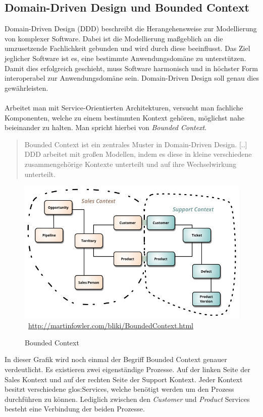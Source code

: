 \subsection{Domain-Driven Design und Bounded Context}
\label{sec:boundedContext}
Domain-Driven Design (DDD) beschreibt die Herangehensweise zur Modellierung von komplexer Software. Dabei ist die Modellierung maßgeblich an die umzusetzende Fachlichkeit gebunden und wird durch diese beeinflusst. Das Ziel jeglicher Software ist es, eine bestimmte Anwendungsdomäne zu unterstützen. Damit dies erfolgreich geschieht, muss Software harmonisch und in höchster Form interoperabel zur Anwendungsdomäne sein. Domain-Driven Design soll genau dies gewährleisten.
\\\\
Arbeitet man mit Service-Orientierten Architekturen, versucht man fachliche Komponenten, welche zu einem bestimmten Kontext gehören, möglichst nahe beieinander zu halten. Man spricht hierbei von \textit{Bounded Context}. 
\begin{quotation}
    \frqq Bounded Context ist ein zentrales Muster in Domain-Driven Design. [..] DDD arbeitet mit großen Modellen, indem es diese in kleine verschiedene zusammengehörige Kontexte unterteilt und auf ihre Wechselwirkung unterteilt.\flqq\ \cite{mfowler:BoundedContext}
\end{quotation}

\begin{figure}[htb]
    \centering 
    \includegraphics[width=\linewidth]{content/images/BoundedContext}\
    \quelle\url{http://martinfowler.com/bliki/BoundedContext.html}
    \caption[Bounded Context]{Bounded Context\\}
    \label{fig:BoundedContext}  
\end{figure} 
\newpage
In dieser Grafik wird noch einmal der Begriff Bounded Context genauer verdeutlicht. Es existieren zwei eigenständige Prozesse. Auf der linken Seite der Sales Kontext und auf der rechten Seite der Support Kontext. Jeder Kontext besitzt verschiedene \gls{glos:Services}, welche benötigt werden um den Prozess durchführen zu können. Lediglich zwischen den \textit{Customer} und \textit{Product} Services besteht eine Verbindung der beiden Prozesse.

